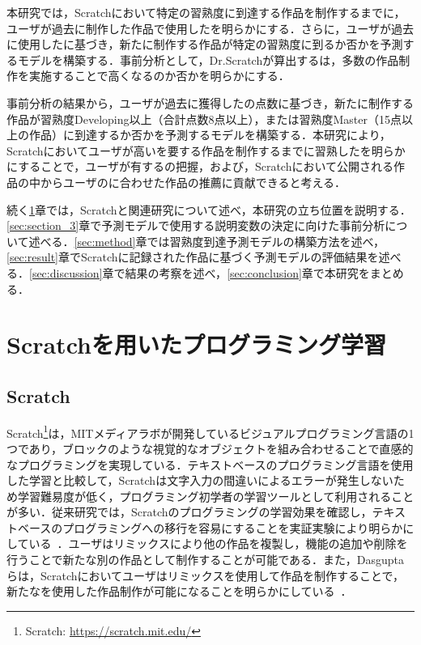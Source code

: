 \documentclass[submit]{ipsj}
\begin{document}
本研究では，Scratchにおいて特定の習熟度に到達する作品を制作するまでに，ユーザが過去に制作した作品で使用した\textcolor{red}{}を明らかにする．さらに，ユーザが過去に使用した\textcolor{red}{}に基づき，新たに制作する作品が特定の習熟度に到るか否かを予測するモデルを構築する．事前分析として，\textcolor{red}{}Dr.Scratchが算出する\textcolor{red}{}は，多数の作品制作を実施することで高くなるのか否かを明らかにする．

事前分析の結果から，ユーザが過去に獲得した\textcolor{red}{}の点数に基づき，新たに制作する作品が習熟度Developing以上（合計点数8点以上），または習熟度Master（15点以上の作品）に到達するか否かを予測するモデルを構築する．本研究により，Scratchにおいてユーザが高い\textcolor{red}{}を要する作品を制作するまでに習熟した\textcolor{red}{}を明らかにすることで，ユーザが有する\textcolor{red}{}の把握，および，Scratchにおいて公開される作品の中からユーザの\textcolor{red}{}に合わせた作品の推薦に貢献できると考える．

続く\ref{sec:visual}章では，Scratchと関連研究について述べ，本研究の立ち位置を説明する．\ref{sec:section_3}章で予測モデルで使用する説明変数の決定に向けた事前分析について述べる．\ref{sec:method}章では習熟度到達予測モデルの構築方法を述べ，\ref{sec:result}章でScratchに記録された作品に基づく予測モデルの評価結果を述べる．\ref{sec:discussion}章で結果の考察を述べ，\ref{sec:conclusion}章で本研究をまとめる．

\section{Scratchを用いたプログラミング学習}\label{sec:visual}

\subsection{Scratch}
Scratch\footnote{Scratch: \url{https://scratch.mit.edu/}}は，MITメディアラボが開発しているビジュアルプログラミング言語の1つであり，ブロックのような視覚的なオブジェクトを組み合わせることで直感的なプログラミングを実現している．テキストベースのプログラミング言語を使用した学習と比較して，Scratchは文字入力の間違いによるエラーが発生しないため学習難易度が低く，プログラミング初学者の学習ツールとして利用されることが多い．従来研究では，Scratchのプログラミングの学習効果を確認し，テキストベースのプログラミングへの移行を容易にすることを実証実験により明らかにしている~\cite{Weintrop_2017}．\textcolor{red}{}ユーザはリミックスにより他の作品を複製し，機能の追加や削除を行うことで新たな別の作品として制作することが可能である．また，Dasguptaらは，Scratchにおいてユーザはリミックスを使用して作品を制作することで，新たな\textcolor{red}{}を使用した作品制作が可能になることを明らかにしている~\cite{Dasgupta_2016}．
\end{document}

